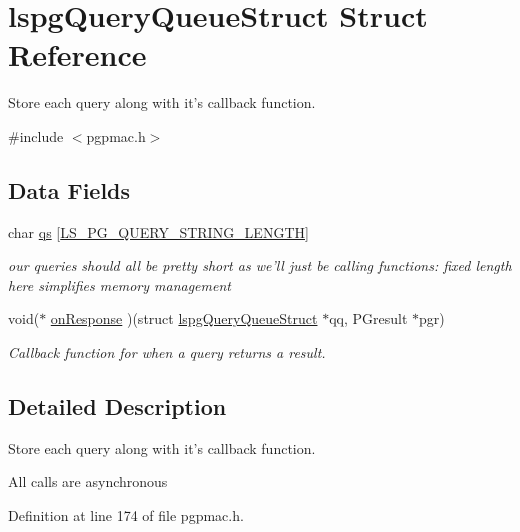 \hypertarget{structlspgQueryQueueStruct}{\section{lspg\-Query\-Queue\-Struct Struct Reference}
\label{structlspgQueryQueueStruct}
}


Store each query along with it's callback function.  




{\ttfamily \#include $<$pgpmac.\-h$>$}

\subsection*{Data Fields}
\begin{DoxyCompactItemize}
\item 
char \hyperlink{structlspgQueryQueueStruct_abf8c9c581b38a5e3e269eda69e47de15}{qs} \mbox{[}\hyperlink{pgpmac_8h_a3a8ef1b4b5994d6dd12bf74454ea891b}{L\-S\-\_\-\-P\-G\-\_\-\-Q\-U\-E\-R\-Y\-\_\-\-S\-T\-R\-I\-N\-G\-\_\-\-L\-E\-N\-G\-T\-H}\mbox{]}
\begin{DoxyCompactList}\small\item\em our queries should all be pretty short as we'll just be calling functions\-: fixed length here simplifies memory management \end{DoxyCompactList}\item 
void($\ast$ \hyperlink{structlspgQueryQueueStruct_a53bac5ae4cab775423940bff5092a831}{on\-Response} )(struct \hyperlink{structlspgQueryQueueStruct}{lspg\-Query\-Queue\-Struct} $\ast$qq, P\-Gresult $\ast$pgr)
\begin{DoxyCompactList}\small\item\em Callback function for when a query returns a result. \end{DoxyCompactList}\end{DoxyCompactItemize}


\subsection{Detailed Description}
Store each query along with it's callback function. 

All calls are asynchronous 

Definition at line 174 of file pgpmac.\-h.



